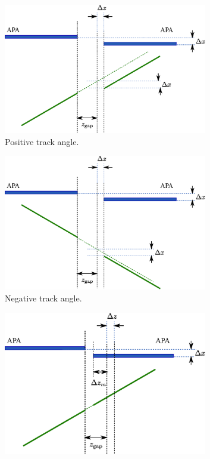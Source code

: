 \begin{figure}
  \centering
  \begin{subfigure}[t]{0.48\linewidth}
    \centering
    \includegraphics[width=0.98\textwidth]{apa_gap_xoffset_zoffset_pos.eps}
    \caption{Positive track angle.}
    \label{fig:APAGapXOffsetZOffsetPos}
  \end{subfigure}
  \hfill
  \begin{subfigure}[t]{0.48\linewidth}
    \centering
    \includegraphics[width=0.98\textwidth]{apa_gap_xoffset_zoffset_neg.eps}
    \caption{Negative track angle.}
    \label{fig:APAGapXOffsetZOffsetNeg}
  \end{subfigure}
  \vfill
  \begin{subfigure}[t]{0.48\linewidth}
    \centering
    \includegraphics[width=0.98\textwidth]{apa_gap_xoffset_zoffset_pos_fix.eps}

\end{subfigure}
\end{figure}
